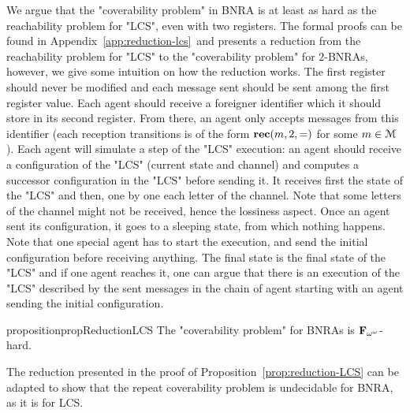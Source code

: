We argue that the "coverability problem" in BNRA is at least as hard as the reachability problem for "LCS", even with two registers. The formal proofs can be found in  Appendix~\ref{app:reduction-lcs}~and presents a reduction from the reachability problem for "LCS" to the "coverability problem" for $2$-BNRAs, however, we give some intuition on how the reduction works. The first register should never be modified and each message sent should be sent among the first register value. Each agent should receive a foreigner identifier which it should store in its second register.  From there, an agent only accepts messages from this identifier (each reception transitions is of the form $\textbf{rec}(m, 2, =)$ for some $m \in \mathcal{M}$). Each agent will simulate a step of the "LCS" execution: an agent should receive a configuration of the "LCS" (current state and channel) and computes a successor configuration in the "LCS" before sending it. It receives first the state of the "LCS" and then, one by one each letter of the channel. Note that some letters of the channel might not be received, hence the lossiness aspect. Once an agent sent its configuration, it goes to a sleeping state, from which nothing happens. Note that one special agent has to start the execution, and send the initial configuration before receiving anything. The final state is the final state of the "LCS" and if one agent reaches it, one can argue that there is an execution of the "LCS" described by the sent messages in the chain of agent starting with an agent sending the initial configuration.

\begin{restatable}{proposition}{propReductionLCS}
	\label{prop:reduction-LCS}
	The "coverability problem" for BNRAs is $\mathbf{F}_{\omega^\omega}$-hard.
\end{restatable}


\begin{remark}
	The reduction presented in the proof of Proposition~\ref{prop:reduction-LCS} can be adapted to show that the repeat coverability problem is undecidable for BNRA, as it is for LCS.
\end{remark}

